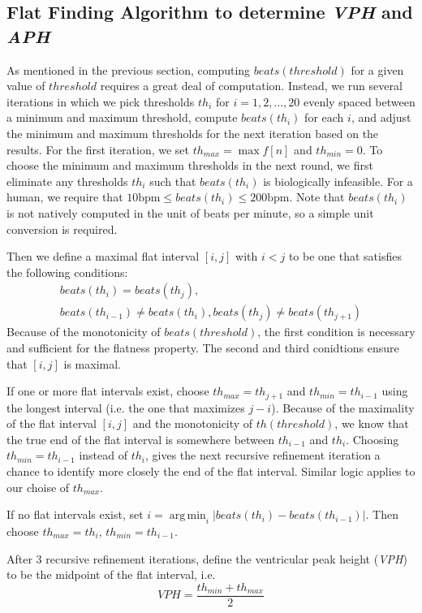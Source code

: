 \documentclass[conference]{IEEEtran}
\newcommand{\APH}{\textit{APH}}
\newcommand{\VPH}{\textit{VPH}}
\DeclareMathOperator*{\argmin}{arg\,min}
\begin{document}
\subsection{Flat Finding Algorithm to determine \VPH{} and \APH{}}
As mentioned in the previous section, computing $beats(threshold)$ for a given value of $threshold$
requires a great deal of
computation. Instead, we run several iterations in which
we pick thresholds $th_i$ for $i = 1, 2, \dots, 20$ evenly spaced
between a minimum and maximum threshold, compute
$beats(th_i)$ for each $i$, and adjust the minimum and
maximum thresholds for the next iteration based on the
results. 
For the first iteration, we set
$th_{max} = \max f[n]$ and $th_{min} = 0$. 
To choose the minimum and maximum thresholds in
the next round, we first eliminate any thresholds $th_i$
such that $beats(th_i)$ is biologically infeasible.
For a human, we require that $10 \text{bpm} \le beats(th_i) \le 200 \text{bpm}$.
Note that $beats(th_i)$ is not natively computed in the unit of beats per minute, so a simple unit conversion is required.

Then we define a maximal flat interval $[i,j]$ with $i<j$ to be one that satisfies the following conditions:
\begin{multline}
	beats(th_i) = beats(th_j),\\ beats(th_{i-1}) \ne beats(th_i), beats(th_j) \ne beats(th_{j+1})
\end{multline}
Because of the monotonicity of $beats(threshold)$, the first condition is necessary and sufficient for the flatness property.
The second and third conidtions ensure that $[i,j]$ is maximal.

If one or more flat intervals exist, choose $th_{max} = th_{j+1}$ and $th_{min}=th_{i-1}$ using the longest interval (i.e. the one that maximizes $j-i$).
Because of the maximality of the flat interval $[i,j]$ and the monotonicity of $th(threshold)$, 
we know that the true end of the flat interval is somewhere between $th_{i-1}$ and $th_i$. 
Choosing $th_{min} = th_{i-1}$ instead of $th_{i}$, gives the next recursive refinement iteration a chance to identify more closely the end of the flat interval.
Similar logic applies to our choise of $th_{max}$.

If no flat intervals exist, set $i=\argmin_{i} |beats(th_i) - beats(th_{i-1})|$.
Then choose $th_{max} = th_i$, $th_{min} = th_{i-1}$.

After 3 recursive refinement iterations, define the ventricular peak height (\VPH{}) to be the midpoint of the flat interval, i.e.
\begin{equation}
	VPH=\frac{th_{min}+th_{max}}{2}
\end{equation}
\end{document}
